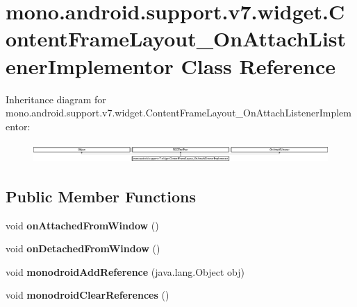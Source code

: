 \hypertarget{classmono_1_1android_1_1support_1_1v7_1_1widget_1_1_content_frame_layout___on_attach_listener_implementor}{}\section{mono.\+android.\+support.\+v7.\+widget.\+Content\+Frame\+Layout\+\_\+\+On\+Attach\+Listener\+Implementor Class Reference}
\label{classmono_1_1android_1_1support_1_1v7_1_1widget_1_1_content_frame_layout___on_attach_listener_implementor}
Inheritance diagram for mono.\+android.\+support.\+v7.\+widget.\+Content\+Frame\+Layout\+\_\+\+On\+Attach\+Listener\+Implementor\+:\begin{figure}[H]
\begin{center}
\leavevmode
\includegraphics[height=0.755736cm]{classmono_1_1android_1_1support_1_1v7_1_1widget_1_1_content_frame_layout___on_attach_listener_implementor}
\end{center}
\end{figure}
\subsection*{Public Member Functions}
\begin{DoxyCompactItemize}
\item 
\mbox{\label{classmono_1_1android_1_1support_1_1v7_1_1widget_1_1_content_frame_layout___on_attach_listener_implementor_aebc22e6de85c5f2e510d674d2fdc2d7e}} 
void {\bfseries on\+Attached\+From\+Window} ()
\item 
\mbox{\label{classmono_1_1android_1_1support_1_1v7_1_1widget_1_1_content_frame_layout___on_attach_listener_implementor_ae3cd180a0da45d1e2f553cc2d63a68af}} 
void {\bfseries on\+Detached\+From\+Window} ()
\item 
\mbox{\label{classmono_1_1android_1_1support_1_1v7_1_1widget_1_1_content_frame_layout___on_attach_listener_implementor_a66402d6035c251dd704de8c08cb0c3e3}} 
void {\bfseries monodroid\+Add\+Reference} (java.\+lang.\+Object obj)
\item 
\mbox{\label{classmono_1_1android_1_1support_1_1v7_1_1widget_1_1_content_frame_layout___on_attach_listener_implementor_a5aeae467b8295109705d686c3e7664c7}} 
void {\bfseries monodroid\+Clear\+References} ()
\end{DoxyCompactItemize}

